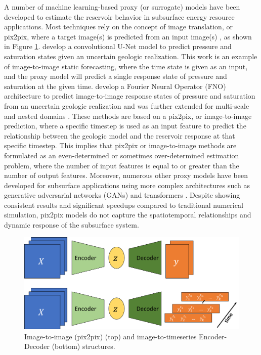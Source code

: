 \documentclass[10pt, twoside]{article}
\begin{document}
A number of machine learning-based proxy (or surrogate) models have been developed to estimate the reservoir behavior in subsurface energy resource applications. Most techniques rely on the concept of image translation, or pix2pix, where a target image(s) is predicted from an input image(s) \cite{Pan2021, Sebacher2022, Bao2022, Ronneberger2015}, as shown in Figure \ref{pix2N}. \citet{Maldonado2021Unet} develop a convolutional U-Net model to predict pressure and saturation states given an uncertain geologic realization. This work is an example of image-to-image static forecasting, where the time state is given as an input, and the proxy model will predict a single response state of pressure and saturation at the given time. \citet{WEN2022104180} develop a Fourier Neural Operator (FNO) architecture to predict image-to-image response states of pressure and saturation from an uncertain geologic realization and was further extended for multi-scale and nested domains \cite{Wen2023Operators}. These methods are based on a pix2pix, or image-to-image prediction, where a specific timestep is used as an input feature to predict the relationship between the geologic model and the reservoir response at that specific timestep. This implies that pix2pix or image-to-image methods are formulated as an even-determined or sometimes over-determined estimation problem, where the number of input features is equal to or greater than the number of output features. Moreover, numerous other proxy models have been developed for subsurface applications using more complex architectures such as generative adversarial networks (GANs) \cite{jo2021machine} and transformers \cite{zhang2023evaluating, zhang2023efficient}. Despite showing consistent results and significant speedups compared to traditional numerical simulation, pix2pix models do not capture the spatiotemporal relationships and dynamic response of the subsurface system.

\begin{figure}
    \centering
    \includegraphics[width=12cm]{figures/pix2N.png}
    \caption{Image-to-image (pix2pix) (top) and image-to-timeseries Encoder-Decoder (bottom) structures.}
    \label{pix2N}
\end{figure}
\end{document}
